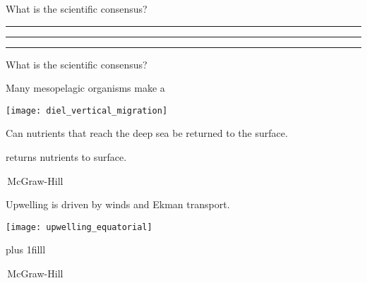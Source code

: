 \documentclass[t]{beamer}
\begin{document}
\begin{frame}[t]{What is the scientific consensus?}

\hangpara \rule{2.5in}{0.4pt}

\vspace*{2\baselineskip}

\hangpara \rule{2.5in}{0.4pt}

\vspace*{2\baselineskip}

\hangpara \rule{2.5in}{0.4pt}

\end{frame}





\begin{frame}[t]{What is the scientific consensus?}

\hangpara{}\pause

\vspace*{2\baselineskip}

\hangpara{}

\vspace*{2\baselineskip}

\hangpara{}\pause

\end{frame}



\begin{frame}[t]{Many mesopelagic organisms make a }

	{\centering
	\texttt{[image: diel\_vertical\_migration]}\par}

\end{frame}


\begin{frame}[t]{Can nutrients that reach the deep sea be returned to the surface.}
\end{frame}


{
\begin{frame}[b]{ returns nutrients to surface.}

\hfill\tiny\textcopyright\,McGraw-Hill
\end{frame}}


\begin{frame}[t]{Upwelling is driven by winds and Ekman transport.}

{\centering
\texttt{[image: upwelling\_equatorial]}\par}

\vskip0pt plus 1filll

\hfill\tiny\textcopyright\,McGraw-Hill
\end{frame}
\end{document}
